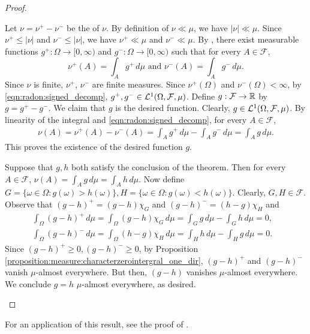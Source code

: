 \begin{proof}
\setcounter{step}{0}
\begin{step}[Existence]
Let $\nu = \nu^{+} - \nu^{-}$ be the  of $\nu$. By definition of $\nu \ll \mu$, we have $|\nu| \ll \mu$. Since $\nu^{+} \leq | \nu |$ and $\nu^{-} \leq |\nu|$, we have $\nu^{+} \ll \mu$ and $\nu^{-} \ll \mu$.
By , there exist measurable functions $g^{+} : \Omega \to [0, \infty)$ and $g^{-} : \Omega \to [0, \infty)$ such that for every $A \in \mathcal{F}$,
\begin{equation}
    \label{eqn:radon:signed_decomp}
    \nu^{+}(A) = \int_{A} g^{+}  \,d\mu \text{ and }\nu^{-}(A) = \int_{A} g^{-} \,d\mu.
\end{equation}
Since $\nu$ is finite, $\nu^{+}$, $\nu^{-}$ are finite measures. Since $\nu^{+}(\Omega)$ and $\nu^{-}(\Omega) < \infty$, by \ref{eqn:radon:signed_decomp}, $g^{+},  g^{-} \in {\mathcal {L}^1}(\Omega, \mathcal{F}, \mu)$. Define $g : \mathcal{F} \to {\mathbb R}$ by $g = g^{+} - g^{-}$. We claim that $g$ is the desired function. Clearly, $g \in {\mathcal {L}^1}(\Omega, \mathcal{F}, \mu)$. \newpage 
By linearity of the integral and \ref{eqn:radon:signed_decomp}, for every $A \in \mathcal{F}$, \begin{align*}
    \nu (A) = \nu^{+}(A) - \nu^{-}(A) = \int_{A} g^{+}  \,d\mu - \int_{A} g^{-} \,d\mu = \int_{A} g \,d\mu.
\end{align*}
This proves the existence of the desired function $g$.
\end{step}
\begin{step}[Uniqueness]
Suppose that $g, h$ both satisfy the conclusion of the theorem. Then for every $A \in \mathcal{F}$, $\nu(A) = \int_A g \,d\mu = \int_A h \,d\mu$. Now define $G = \{ \omega \in \Omega : g (\omega) > h (\omega) \}, H = \{ \omega \in \Omega : g (\omega) < h (\omega) \}$.
Clearly, $G, H \in \mathcal{F}$. Observe that $(g - h)^+ = (g - h) \chi_G$ and  $(g - h)^- = (h - g) \chi_H$ and
\begin{align*}
    \int_{\Omega} (g - h)^+ \,d\mu = \int_{\Omega} (g - h) \chi_G \,d\mu = \int_{G} g \,d\mu - \int_{G} h \,d\mu = 0, & \\
    \int_{\Omega} (g - h)^- \,d\mu = \int_{\Omega} (h - g) \chi_H \,d\mu = \int_{H} h \,d\mu - \int_{H} g \,d\mu = 0.
\end{align*}
Since $(g - h)^+ \geq 0, (g - h)^- \geq 0$, by Proposition \ref{proposition:measure:characterzerointergral_one_dir}, $(g - h)^+$ and $(g - h)^-$ vanish $\mu$-almost everywhere. But then, $(g - h)$ vanishes $\mu$-almost everywhere. We conclude $g = h$ $\mu$-almost everywhere, as desired.
\end{step}
\end{proof}
For an application of this result, see the proof of .